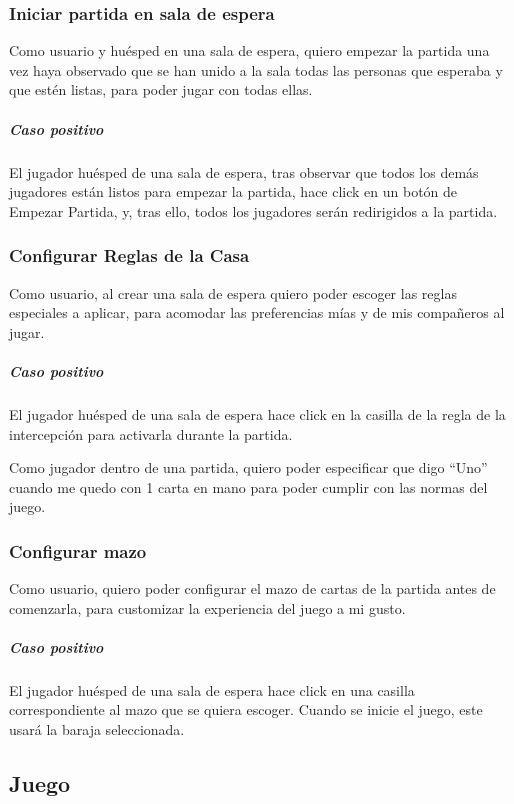 \subsubsection{Iniciar partida en sala de espera}

Como usuario y huésped en una sala de espera, quiero empezar la partida una vez haya observado que se han unido a la sala todas las personas que esperaba y que estén listas, para poder jugar con todas ellas. 

\subparagraph{Caso positivo}

El jugador huésped de una sala de espera, tras observar que todos los demás jugadores están listos para empezar la partida, hace click en un botón de Empezar Partida, y, tras ello, todos los jugadores serán redirigidos a la partida. 

\subsubsection{Configurar Reglas de la Casa}

Como usuario, al crear una sala de espera quiero poder escoger las reglas especiales a aplicar, para acomodar las preferencias mías y de mis compañeros al jugar. 

\subparagraph{Caso positivo}

El jugador huésped de una sala de espera hace click en la casilla de la regla de la intercepción para activarla durante la partida. 

Como jugador dentro de una partida, quiero poder especificar que digo “Uno” cuando me quedo con 1 carta en mano para poder cumplir con las normas del juego. 

\subsubsection{Configurar mazo}

Como usuario, quiero poder configurar el mazo de cartas de la partida antes de comenzarla,
para customizar la experiencia del juego a mi gusto.

\subparagraph{Caso positivo}

El jugador huésped de una sala de espera hace click en una casilla correspondiente al
mazo que se quiera escoger. Cuando se inicie el juego, este usará la baraja seleccionada.

\subsection{Juego}

